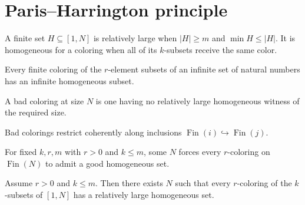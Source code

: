 \section{Paris--Harrington principle}

\begin{definition}
\label{def:ph-relatively-large}
\leanok
A finite set $H\subseteq[1,N]$ is relatively large when $|H|\ge m$ and $\min H\le |H|$. It is homogeneous for a coloring when all of its $k$-subsets receive the same color.
\end{definition}

\begin{lemma}
\label{lem:ph-infinite-ramsey}
\leanok
Every finite coloring of the $r$-element subsets of an infinite set of natural numbers has an infinite homogeneous subset.
\end{lemma}

\begin{definition}
\label{def:ph-bad-coloring}
\leanok
A bad coloring at size $N$ is one having no relatively large homogeneous witness of the required size.
\end{definition}

\begin{lemma}
\label{lem:ph-bad-restrict}
\leanok
{}
Bad colorings restrict coherently along inclusions $\operatorname{Fin}(i)\hookrightarrow\operatorname{Fin}(j)$.
\end{lemma}

\begin{lemma}
\label{lem:ph-uniform-bound}
\leanok
{}
For fixed $k,r,m$ with $r>0$ and $k\le m$, some $N$ forces every $r$-coloring on $\operatorname{Fin}(N)$ to admit a good homogeneous set.
\end{lemma}

\begin{theorem}
\label{thm:paris-harrington}
\leanok
{}
Assume $r>0$ and $k\le m$. Then there exists $N$ such that every $r$-coloring of the $k$-subsets of $[1,N]$ has a relatively large homogeneous set.
\end{theorem}
